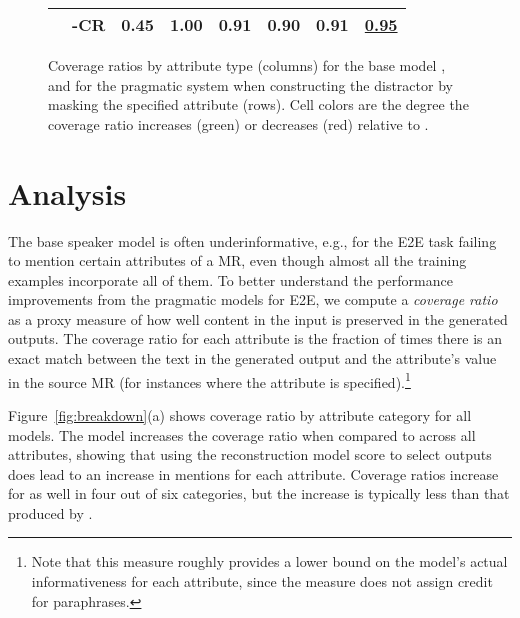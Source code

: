 \documentclass[11pt,a4paper]{article}
\newcommand{\pragd}[0]{\xspace}
\newcommand{\pragr}[0]{\xspace}
\newcommand{\eg}{e.g., }
\def\rot#1{\rotatebox{90}{#1}}
\begin{document}
\begin{figure*}[t]
\begin{subfigure}[b]{0.49\textwidth}
{\begin{tabular}{p{1mm}l|cccccc}
 \rot{\rlap{Distractor Attr.}} & \pragd-CR & 0.45\cellcolor{snsred!37} & 1.00\cellcolor{snsgreen!44} & 0.91\cellcolor{snsgreen!12} & 0.90\cellcolor{snsred!4} & 0.91\cellcolor{snsred!50} & \underline{0.95}\cellcolor{snsgreen!45} \\
\bottomrule
\end{tabular}
}
\caption{
Coverage ratios by attribute type (columns) for the base model , and for the pragmatic system  when constructing the distractor by masking the specified attribute (rows). Cell colors are the degree the coverage ratio increases (green) or decreases (red) relative to . \vspace{-.5em}
}
\end{subfigure}
\caption{Coverage ratios for the E2E task by attribute type, estimating how frequently the values for each attribute from the input meaning representations are mentioned in the output text. 
}
\vspace{-1em}
\label{fig:breakdown}
\end{figure*}

\section{Analysis}
The base speaker  model is often underinformative, \eg for the E2E task failing to mention certain attributes of a MR, even though almost all the training examples incorporate all of them.
To better understand the performance improvements from the pragmatic models for E2E, we 
compute a \emph{coverage ratio} as a proxy measure of how well content in the input is preserved in the generated outputs.
The coverage ratio for each attribute is the fraction of times there is an exact match between the text in the generated output and the attribute's value in the source MR (for instances where the attribute is specified).\footnote{Note that this measure roughly provides a lower bound on the model's actual informativeness for each attribute, since the measure does not assign credit for paraphrases. 
}



Figure~\ref{fig:breakdown}(a) shows coverage ratio by attribute category for all models. The \pragr model increases the coverage ratio when compared to  across all attributes, showing that using the reconstruction model score to select outputs does lead to an increase in mentions for each attribute. Coverage ratios increase for \pragd as well in four out of six categories, but the increase is typically less than that produced by \pragr. 
\end{document}
